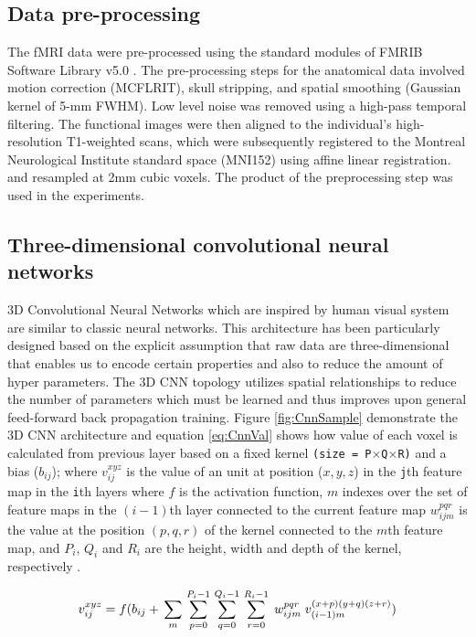 \documentclass[preprint,12pt]{elsarticle}
\begin{document}
\subsection{Data pre-processing}
\label{section:preprocessing}
The fMRI data were pre-processed using the standard modules of FMRIB Software Library v5.0 \cite{FMRIB}. The pre-processing steps for the anatomical data involved motion correction (MCFLRIT), skull stripping, and spatial smoothing (Gaussian kernel of 5-mm FWHM). Low level noise was removed using a high-pass temporal filtering. The functional images were then aligned to the individual's high-resolution T1-weighted scans, which were subsequently registered to the Montreal Neurological Institute standard space (MNI152) using affine linear registration. and resampled at 2mm cubic voxels. The product of the preprocessing step was used in the experiments.



\subsection{Three-dimensional convolutional neural networks}
\label{section:3dCnn}
3D Convolutional Neural Networks which are inspired by human visual system are similar to classic neural networks. This architecture has been particularly designed based on the explicit assumption that raw data are three-dimensional that enables us to encode certain properties and also to reduce the amount of hyper parameters. The 3D CNN topology utilizes spatial relationships to reduce the number of parameters which must be learned and thus improves upon general feed-forward back propagation training. Figure \ref{fig:CnnSample} demonstrate the 3D CNN architecture and equation \eqref{eq:CnnVal} shows how value of each voxel is calculated from previous layer based on a fixed kernel \texttt{(size = P$\times$Q$\times$R)} and a bias ($b_{ij}$); where $v^{ xyz }_{ ij }$ is the value of an unit at position ($x,y,z$) in the  \texttt{j}th feature map in the \texttt{i}th layers where $f$ is the activation function, $m$ indexes over the set of
feature maps in the $(i-1)$th layer connected to the current feature map $w^{pqr}_{ijm}$ is the value at the position $(p,q,r)$ of the kernel connected to the $m$th feature map, and $P_i$, $Q_i$ and $R_i$ are the height, width and depth of the kernel, respectively \cite{Ji2013}.

\begin{equation}
v^{ xyz }_{ ij } = \\
f(  \\
b_{ij} +  \\
\sum_m \\ 
\sum_{p=0}^{P_i-1} \\
\sum_{q=0}^{Q_i-1} \\
\sum_{r=0}^{R_i-1} \\
\; w^{pqr}_{ijm}  \\
\; v ^ { (x+p)(y+q)(z+r) }_{ (i-1)m } \\
) \label{eq:CnnVal}
\end{equation}
\end{document}
